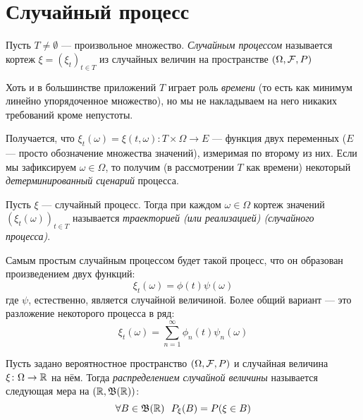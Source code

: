 \section{Случайный процесс}

\begin{definition}
	Пусть $T \neq \emptyset$ --- произвольное множество. \textit{Случайным процессом} называется кортеж $\xi = (\xi_t)_{t \in T}$ из случайных величин на пространстве $(\Omega, \mathcal{F}, P)$
\end{definition}

\begin{note}
	Хоть и в большинстве приложений $T$ играет роль \textit{времени} (то есть как минимум линейно упорядоченное множество), но мы не накладываем на него никаких требований кроме непустоты.
\end{note}

\begin{note}
	Получается, что $\xi_t(\omega) = \xi(t, \omega) \colon T \times \Omega \to E$ --- функция двух переменных ($E$ --- просто обозначение множества значений), измеримая по второму из них. Если мы зафиксируем $\omega \in \Omega$, то получим (в рассмотрении $T$ как времени) некоторый \textit{детерминированный сценарий} процесса.
\end{note}

\begin{definition}
	Пусть $\xi$ --- случайный процесс. Тогда при каждом $\omega \in \Omega$ кортеж значений $(\xi_t(\omega))_{t \in T}$ называется \textit{траекторией (или реализацией) (случайного процесса)}.
\end{definition}

\begin{example}
	Самым простым случайным процессом будет такой процесс, что он образован произведением двух функций:
	\[
		\xi_t(\omega) = \phi(t)\psi(\omega)
	\]
	где $\psi$, естественно, является случайной величиной. Более общий вариант --- это разложение некоторого процесса в ряд:
	\[
		\xi_t(\omega) = \sum_{n = 1}^\infty \phi_n(t)\psi_n(\omega)
	\]
\end{example}

\begin{reminder}
	Пусть задано вероятностное пространство $(\Omega, \mathcal{F}, P)$ и случайная величина $\xi \colon \Omega \to \mathbb{R}$ на нём. Тогда \textit{распределением случайной величины} называется следующая мера на $(\mathbb{R}, \mathfrak{B}(\mathbb{R}))$:
	\[
		\forall B \in \mathfrak{B}(\mathbb{R})\ \ P_\xi(B) = P(\xi \in B)
	\]
\end{reminder}


